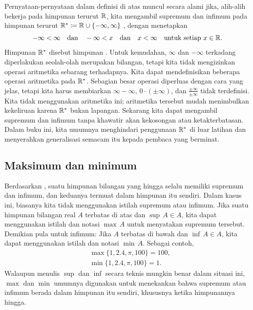 Pernyataan-pernyataan dalam definisi di atas
muncul secara alami jika, alih-alih bekerja pada
himpunan terurut ${\mathbb{R}}$, kita mengambil supremum dan infimum
pada himpunan terurut
${\mathbb{R}}^* \coloneqq {\mathbb{R}} \cup \{ -\infty , \infty\}$
,
dengan menetapkan
\begin{equation*}
-\infty < \infty \quad \text{dan} \quad
-\infty < x \quad \text{dan} \quad
x < \infty \quad \text{untuk setiap $x \in {\mathbb{R}}$}.
\end{equation*}
Himpunan ${\mathbb{R}}^*$ disebut himpunan \emph{}.
Untuk kemudahan, $\infty$ dan $-\infty$ terkadang diperlakukan seolah-olah merupakan
bilangan, tetapi kita tidak mengizinkan operasi aritmetika sebarang terhadapnya.
Kita dapat mendefinisikan beberapa operasi aritmetika pada ${\mathbb{R}}^*$.  Sebagian besar operasi
diperluas dengan cara yang jelas, tetapi kita harus membiarkan
$\infty-\infty$, $0 \cdot (\pm\infty)$, dan $\frac{\pm\infty}{\pm\infty}$
tidak terdefinisi.
Kita tidak
menggunakan aritmetika ini;
aritmetika tersebut mudah menimbulkan kekeliruan karena ${\mathbb{R}}^*$ bukan lapangan.
Sekarang kita dapat mengambil supremum dan infimum tanpa khawatir akan kekosongan atau
ketakterbatasan.  Dalam buku ini, kita umumnya menghindari
penggunaan ${\mathbb{R}}^*$ di luar latihan dan menyerahkan generalisasi semacam itu kepada pembaca yang berminat.

\subsection{Maksimum dan minimum}

Berdasarkan ,
suatu himpunan bilangan yang hingga selalu memiliki supremum dan infimum,
dan keduanya termuat dalam himpunan itu sendiri.
Dalam kasus ini, biasanya kita tidak menggunakan istilah supremum atau infimum.
Jika suatu himpunan bilangan real $A$ terbatas di atas dan
$\sup\, A \in A$, kita dapat menggunakan istilah
\emph{} dan notasi $\max\, A$ untuk menyatakan supremum tersebut.
Demikian pula untuk infimum: Jika $A$ terbatas di bawah
dan $\inf\, A \in A$, kita dapat menggunakan
istilah \emph{} dan notasi $\min\, A$.
Sebagai contoh,
\begin{align*}
& \max \{ 1,2.4,\pi,100 \} = 100 , \\
& \min \{ 1,2.4,\pi,100 \} = 1 .
\end{align*}
Walaupun menulis $\sup$ dan $\inf$ secara teknis mungkin
benar dalam situasi ini, $\max$ dan
$\min$ umumnya digunakan untuk menekankan bahwa supremum atau infimum
berada dalam himpunan itu sendiri, khususnya ketika himpunannya hingga.

